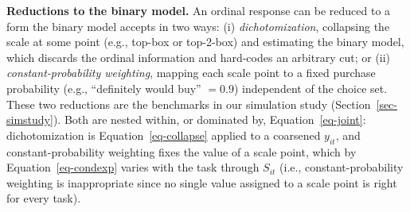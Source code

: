 \documentclass[
  letterpaper,
  DIV=11,
  numbers=noendperiod]{scrartcl}
\theoremstyle{plain}
\theoremstyle{plain}
\theoremstyle{plain}
\theoremstyle{remark}
\begin{document}
\textbf{Reductions to the binary model.} An ordinal response can be
reduced to a form the binary model accepts in two ways: (i)
\emph{dichotomization}, collapsing the scale at some point (e.g.,
top-box or top-2-box) and estimating the binary model, which discards
the ordinal information and hard-codes an arbitrary cut; or (ii)
\emph{constant-probability weighting}, mapping each scale point to a
fixed purchase probability (e.g., ``definitely would buy'' \(= 0.9\))
independent of the choice set. These two reductions are the benchmarks
in our simulation study (Section~\ref{sec-simstudy}). Both are nested
within, or dominated by, Equation~\ref{eq-joint}: dichotomization is
Equation~\ref{eq-collapse} applied to a coarsened \(y_{it}\), and
constant-probability weighting fixes the value of a scale point, which
by Equation~\ref{eq-condexp} varies with the task through \(S_{it}\)
(i.e., constant-probability weighting is inappropriate since no single
value assigned to a scale point is right for every task).
\end{document}
